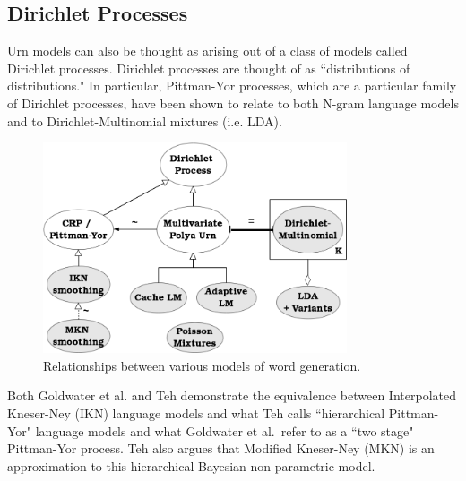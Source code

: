 %
%
%


\subsection{Dirichlet Processes}

Urn models can also be thought as arising out of a class of models called Dirichlet processes.   Dirichlet processes are thought of as ``distributions of distributions."\cite{teh2010dirichlet}   In particular, Pittman-Yor processes, which are a particular family of Dirichlet processes, have been shown to relate to both N-gram language models and to Dirichlet-Multinomial mixtures (i.e. LDA).  %


\begin{figure}[t]
\centering
\includegraphics[width=0.8\textwidth]{lms.png}
\caption[Models of word generation]{Relationships between various models of word generation.\label{topicLMS}}
\end{figure}


Both Goldwater et al.\cite{goldwater2011} and Teh \cite{teh2006} demonstrate the equivalence between Interpolated Kneser-Ney (IKN) language models and what Teh calls ``hierarchical Pittman-Yor" language models and what Goldwater et al.\ refer to as a ``two stage" Pittman-Yor process.   Teh also argues that Modified Kneser-Ney (MKN) is an approximation to this hierarchical Bayesian non-parametric model.

